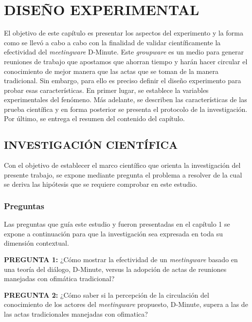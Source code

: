 \section{DISE\~NO EXPERIMENTAL}

El objetivo de este capítulo es presentar los aspectos del experimento y la forma como se llevó a cabo a cabo con la finalidad de validar científicamente la efectividad del \textit{meetingware} D-Minute. Este \textit{groupware} es un medio para generar reuniones de trabajo que apostamos que ahorran tiempo y harán hacer circular el conocimiento de mejor manera que las actas que se toman de la manera tradicional. Sin embargo, para ello es preciso definir el diseño experimento para probar esas características. En primer lugar, se establece la variables experimentales del fenómeno. Más adelante, se describen las características de las prueba científica y en forma posterior se presenta el protocolo de la investigación. Por último, se entrega el resumen del contenido del capítulo. 

\subsection{INVESTIGACIÓN CIENTÍFICA}

Con el objetivo de establecer el marco científico que orienta la investigación del presente trabajo, se expone mediante pregunta el problema a resolver de la cual se deriva las hipótesis que se requiere comprobar en este estudio.

\subsubsection{Preguntas}

Las preguntas que guía este estudio y fueron presentadas en el capítulo 1  se expone a continuación para que la investigación sea expresada en toda su dimensión contextual.\newline

\textbf{PREGUNTA 1:} ¿Cómo mostrar la efectividad de un \textit{meetingware} basado en una teoría del diálogo, D-Minute, versus la adopción de actas de reuniones manejadas con ofimática tradicional?\newline

\textbf{PREGUNTA 2:} ¿Cómo saber si la percepción de la circulación del conocimiento de los actores del \textit{meetingware} propuesto, D-Minute, supera a las de las actas tradicionales manejadas con ofimatica?

